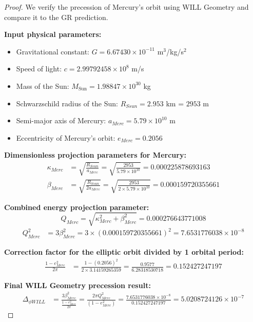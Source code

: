 \documentclass[12pt, a4paper]{article}
\begin{document}
\begin{proof}
We verify the precession of Mercury's orbit using WILL Geometry and compare it to the GR prediction.

\textbf{Input physical parameters:}
\begin{itemize}
\item Gravitational constant: $G = 6.67430 \times 10^{-11}$ m$^3$/kg/s$^2$
\item Speed of light: $c = 2.99792458 \times 10^8$ m/s
\item Mass of the Sun: $M_{\text{Sun}} = 1.98847 \times 10^{30}$ kg
\item Schwarzschild radius of the Sun: $R_{Ssun} = 2.953$ km = $2953$ m
\item Semi-major axis of Mercury: $a_{Merc} = 5.79 \times 10^{10}$ m
\item Eccentricity of Mercury's orbit: $e_{Merc} = 0.2056$
\end{itemize}

\textbf{Dimensionless projection parameters for Mercury:}
\begin{align}
\kappa_{Merc} &= \sqrt{\frac{R_{Ssun}}{a_{Merc}}} = \sqrt{\frac{2953}{5.79 \times 10^{10}}} = 0.000225878693163 \\
\beta_{Merc} &= \sqrt{\frac{R_{Ssun}}{2 a_{Merc}}} = \sqrt{\frac{2953}{2 \times 5.79 \times 10^{10}}} = 0.000159720355661
\end{align}

\textbf{Combined energy projection parameter:}
\[
Q_{Merc}=\sqrt{\kappa_{Merc}^{2}+\beta_{Merc}^{2}}=0.000276643771008
\]
\begin{align}
Q_{Merc}^{2} &= 3 \beta_{Merc}^{2} = 3 \times (0.000159720355661)^2 = 7.6531776038 \times 10^{-8}
\end{align}

\textbf{Correction factor for the elliptic orbit divided by 1 orbital period:}
\begin{align}
\frac{1 - e_{Merc}^{2}}{2\pi} &= \frac{1 - (0.2056)^2}{2 \times 3.14159265359} = \frac{0.9577}{6.28318530718} = 0.152427247197
\end{align}

\textbf{Final WILL Geometry precession result:}
\begin{align}
Δ _{\phi WILL} &= \frac{3 \beta_{Merc}^{2}}{\frac{1 - e_{Merc}^{2}}{2\pi}} = \frac{2\pi Q_{Merc}^{2}}{\left(1-e_{Merc}^{2}\right)}=\frac{7.6531776038 \times 10^{-8}}{0.152427247197} = 5.0208724126 \times 10^{-7}
\end{align}


\end{proof}
\end{document}
